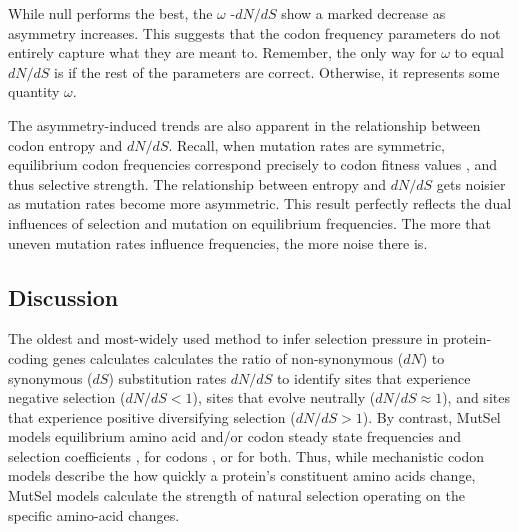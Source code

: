 \documentclass[11pt]{article}
\begin{document}
While null performs the best, the $\omega$ -$dN/dS$ show a marked decrease as asymmetry increases. This suggests that the codon frequency parameters do not entirely capture what they are meant to. Remember, the only way for $\omega$ to equal $dN/dS$ is if the rest of the parameters are correct. Otherwise, it represents some quantity $\omega$. 

The asymmetry-induced trends are also apparent in the relationship between codon entropy and $dN/dS$. Recall, when mutation rates are symmetric, equilibrium codon frequencies correspond precisely to codon fitness values \cite{SellaHirsh2005}, and thus selective strength. The relationship between entropy and $dN/dS$ gets noisier as mutation rates become more asymmetric. This result perfectly reflects the dual influences of selection and mutation on equilibrium frequencies. The more that uneven mutation rates influence frequencies, the more noise there is. 


\subsection*{Discussion}




The oldest and most-widely used method to infer selection pressure in protein-coding genes calculates calculates the ratio of non-synonymous ($dN$) to synonymous ($dS$) substitution rates $dN/dS$ to identify sites that experience negative selection ($dN/dS<1$), sites that evolve neutrally ($dN/dS\approx1$), and sites that experience positive diversifying selection ($dN/dS>1$). By contrast, MutSel models equilibrium amino acid and/or codon steady state frequencies and selection coefficients \cite{HalpernBruno1998,NielsenYang2008,Rodrigueetal2010,Tamurietal2012,Tamurietal2014}, for codons \cite{YangNielsen2008}, or for both. Thus, while mechanistic codon models describe the how quickly a protein's constituent amino acids change, MutSel models calculate the strength of natural selection operating on the specific amino-acid changes.  
\end{document}
